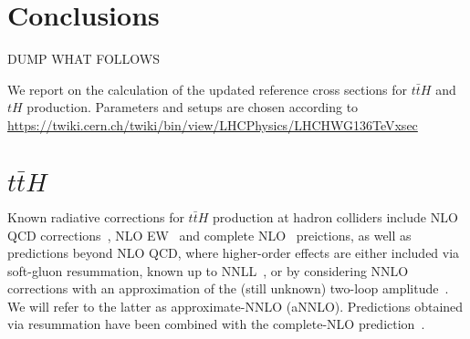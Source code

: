 \documentclass[a4paper,usenames,dvipsnames,11pt]{article}
\begin{document}
\section{Conclusions}
\label{sec:concl}



{\Large DUMP WHAT FOLLOWS}

We report on the calculation of the updated reference cross sections for $t\bar t H$ and $t H$ production. Parameters and setups are chosen according to
\url{https://twiki.cern.ch/twiki/bin/view/LHCPhysics/LHCHWG136TeVxsec}


\section{$t\bar t H$}
Known radiative corrections for $t \bar t H$ production at hadron colliders include NLO QCD corrections~\cite{Reina:2001sf,Reina:2001bc,Dawson:2002tg},
NLO EW~\cite{Frixione:2014qaa,Zhang:2014gcy,Frixione:2015zaa} and complete NLO~\cite{Frederix:2018nkq} preictions, as well as predictions 
beyond NLO QCD, where higher-order effects are either included via soft-gluon resummation, known up to 
NNLL~\cite{Broggio:2015lya,Kulesza:2015vda,Broggio:2016lfj,Kulesza:2017ukk}, or by considering NNLO corrections with 
an approximation of the (still unknown) two-loop
amplitude~\cite{Catani:2022mfv}. We will refer to the latter as approximate-NNLO (aNNLO). Predictions obtained via resummation have been combined
with the complete-NLO prediction~\cite{ Kulesza:2018tqz,Broggio:2019ewu,Kulesza:2020nfh}. 
\end{document}

